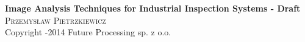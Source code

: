 \newcommand{\coverPage}[3]
{
	\begin{titlingpage}
	\begin{center}







	{ \huge \bfseries #2}\\[0.4cm]

	\textsc{\Large #1}\\[0.5cm]
	\null
	\vfill
	{\small #3}
	\end{center}
	\end{titlingpage}



	\thispagestyle{empty}	
	\newpage
}


\coverPage
{Przemys\l aw Pietrzkiewicz}
{Image Analysis Techniques for Industrial Inspection Systems - Draft}
{Copyright \textcopyright 2012-2014 Future Processing sp. z o.o.}
